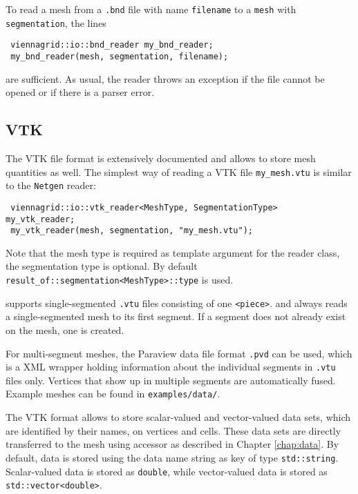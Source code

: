  To read a mesh from a \texttt{.bnd} file with name \lstinline|filename| to a \lstinline|mesh| with \lstinline|segmentation|, the lines
 \begin{lstlisting}
 viennagrid::io::bnd_reader my_bnd_reader;
 my_bnd_reader(mesh, segmentation, filename);
 \end{lstlisting}
 are sufficient. As usual, the reader throws an exception if the file cannot be opened or if there is a parser error.


 \subsection{VTK}
 The VTK file format is extensively documented \cite{VTKfileformat} and allows to store mesh quantities as well.
 The simplest way of reading a VTK file \lstinline|my_mesh.vtu| is similar to the \texttt{Netgen} reader:
 \begin{lstlisting}
 viennagrid::io::vtk_reader<MeshType, SegmentationType>  my_vtk_reader;
 my_vtk_reader(mesh, segmentation, "my_mesh.vtu");
 \end{lstlisting}
 Note that the mesh type is required as template argument for the reader class, the segmentation type is optional. By default \lstinline|result_of::segmentation<MeshType>::type| is used.

 {\ViennaGrid} supports single-segmented \lstinline|.vtu| files consisting of one \lstinline|<piece>|.
 and always reads a single-segmented mesh to its first segment. If a segment does not already exist on the mesh, one is created.

 For multi-segment meshes, the Paraview \cite{paraview} data file format \lstinline|.pvd| can be used, which is a XML wrapper holding information about the individual segments in \lstinline|.vtu| files only. Vertices that show up in multiple segments are automatically fused. Example meshes can be found in \texttt{examples/data/}.


 The VTK format allows to store scalar-valued and vector-valued data sets, which are identified by their names, on vertices and cells.
 These data sets are directly transferred to the {\ViennaGrid} mesh using accessor as described in Chapter \ref{chap:data}.
 By default, data is stored using the data name string as key of type \lstinline|std::string|.
 Scalar-valued data is stored as \lstinline|double|, while vector-valued data is stored as \lstinline|std::vector<double>|.

